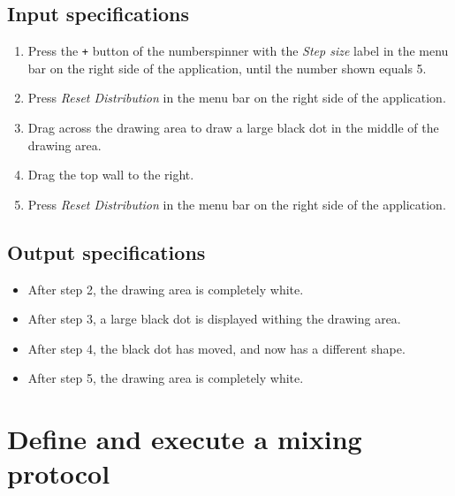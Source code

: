 \subsection*{Input specifications}
\begin{enumerate}
\item Press the \texttt{+} button of the numberspinner with the \emph{Step size} label in the menu bar on the right side of the application, until the number shown equals 5.
\item Press \emph{Reset Distribution} in the menu bar on the right side of the application. 
\item Drag across the drawing area to draw a large black dot in the middle of the drawing area.
\item Drag the top wall to the right.
\item Press \emph{Reset Distribution} in the menu bar on the right side of the application. 
\end{enumerate}

\subsection*{Output specifications}
\begin{itemize}
\item After step 2, the drawing area is completely white.
\item After step 3, a large black dot is displayed withing the drawing area.
\item After step 4, the black dot has moved, and now has a different shape.
\item After step 5, the drawing area is completely white.
\end{itemize}

\section{Define and execute a mixing protocol}

